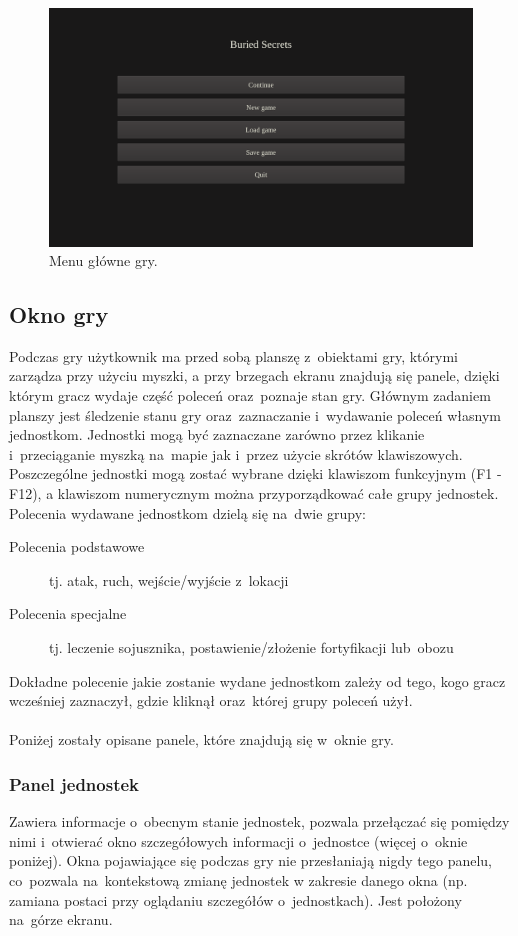 \documentclass[licencjacka]{pracamgr}
\begin{document}
      \begin{figure}[htbp]
	\centering
	\includegraphics[scale=0.22]{MainMenu.png}
	\caption{Menu główne gry.}
      \end{figure}

    \subsection{Okno gry}
      Podczas gry użytkownik ma przed sobą planszę z~obiektami gry, którymi zarządza przy użyciu myszki, a przy brzegach ekranu znajdują się panele,
      dzięki którym gracz wydaje część poleceń oraz~poznaje stan gry. Głównym zadaniem planszy jest śledzenie stanu gry oraz~zaznaczanie i~wydawanie poleceń
      własnym jednostkom. Jednostki mogą być zaznaczane zarówno przez klikanie i~przeciąganie myszką na~mapie jak i~przez użycie skrótów klawiszowych.
      Poszczególne jednostki mogą zostać wybrane dzięki klawiszom funkcyjnym (F1 - F12), a klawiszom numerycznym można przyporządkować całe grupy jednostek.
      Polecenia wydawane jednostkom dzielą się na~dwie grupy:
      \begin{description}
       \item[Polecenia podstawowe] tj. atak, ruch, wejście/wyjście z~lokacji
       \item[Polecenia specjalne] tj. leczenie sojusznika, postawienie/złożenie fortyfikacji lub~obozu
      \end{description}
      Dokładne polecenie jakie zostanie wydane jednostkom zależy od tego, kogo gracz wcześniej zaznaczył, gdzie kliknął oraz~której grupy poleceń użył.
      \\\ \\ \noindent
      Poniżej zostały opisane panele, które znajdują się w~oknie gry.

      \subsubsection{Panel jednostek}
	Zawiera informacje o~obecnym stanie jednostek, pozwala przełączać się pomiędzy nimi i~otwierać okno szczegółowych informacji o~jednostce
	(więcej o~oknie poniżej). Okna pojawiające się podczas gry nie przesłaniają nigdy tego panelu, co~pozwala na~kontekstową zmianę jednostek
	w zakresie danego okna (np. zamiana postaci przy oglądaniu szczegółów o~jednostkach). Jest położony na~górze ekranu.
\end{document}
